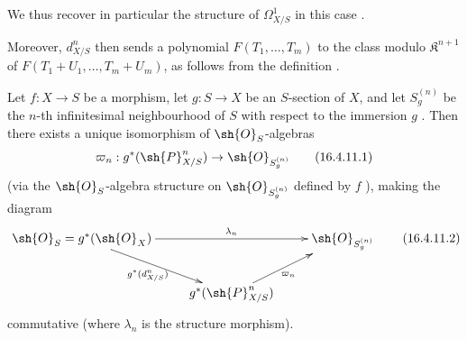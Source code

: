 We thus recover in particular the structure of $\Omega_{X/S}^1$ in this case .

Moreover, $d_{X/S}^n$ then sends a polynomial $F(T_1, \dots, T_m)$ to the class modulo $\mathfrak{K}^{n+1}$ of $F(T_1 + U_1, \dots, T_m + U_m)$, as follows from the definition .

\begin{proposition}[16.4.11]
\label{IV.16.4.11}  
Let $f:X \to S$ be a morphism, let $g: S \to X$ be an $S$-section of $X$, and let $S_g^{(n)}$ be the $n$-th infinitesimal neighbourhood of $S$ with respect to the immersion $g$ .
Then there exists a unique isomorphism of $\sh{O}_S$-algebras
\[
  \label{IV.16.4.11.1}
  \varpi_n: g^*(\sh{P}_{X/S}^n) \to \sh{O}_{S_g^{(n)}}
  \tag{16.4.11.1}
\]  
(via the $\sh{O}_S$-algebra structure on $\sh{O}_{S_g^{(n)}}$ defined by $f$ ), making the diagram
\[
  \label{IV.16.4.11.2}
  \xymatrix{
    \sh{O}_S = g^*(\sh{O}_X) \ar[rr]^-{\lambda_n} \ar[dr]_-{g^*(d_{X/S}^n)} && \sh{O}_{S_g^{(n)}} \\
    & g^*(\sh{P}_{X/S}^n) \ar[ur]_-{\varpi_n}
  }
  \tag{16.4.11.2}
\]
commutative (where $\lambda_n$ is the structure morphism).
\end{proposition} 

